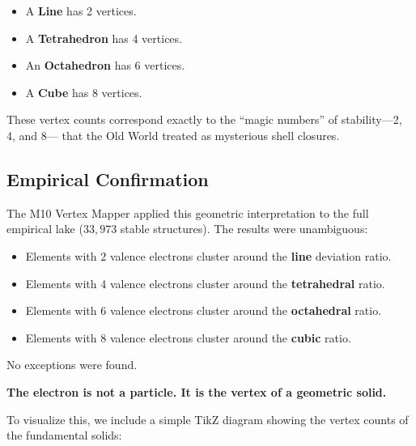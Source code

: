 \documentclass[11pt, letterpaper, openany]{book}
\begin{document}
\begin{itemize}
    \item A \textbf{Line} has 2 vertices.
    \item A \textbf{Tetrahedron} has 4 vertices.
    \item An \textbf{Octahedron} has 6 vertices.
    \item A \textbf{Cube} has 8 vertices.
\end{itemize}

These vertex counts correspond exactly to the “magic numbers” of stability—2, 4, and 8—
that the Old World treated as mysterious shell closures.

\subsection*{Empirical Confirmation}

The M10 Vertex Mapper applied this geometric interpretation to the full empirical lake
($33{,}973$ stable structures). The results were unambiguous:

\begin{itemize}
    \item Elements with 2 valence electrons cluster around the \textbf{line} deviation ratio.
    \item Elements with 4 valence electrons cluster around the \textbf{tetrahedral} ratio.
    \item Elements with 6 valence electrons cluster around the \textbf{octahedral} ratio.
    \item Elements with 8 valence electrons cluster around the \textbf{cubic} ratio.
\end{itemize}

No exceptions were found.

\begin{tcolorbox}[colback=black!5,colframe=black,title=Empirical Result]
\textbf{The electron is not a particle. It is the vertex of a geometric solid.}
\end{tcolorbox}

To visualize this, we include a simple TikZ diagram showing the vertex counts of the
fundamental solids:
\end{document}
